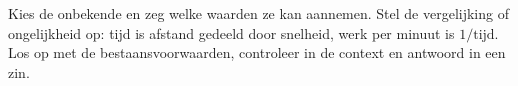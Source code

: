 \begin{werkwijze}
Kies de onbekende en zeg welke waarden ze kan aannemen. Stel de vergelijking of ongelijkheid op: tijd is afstand gedeeld door snelheid, werk per minuut is $1 / \text{tijd}$. Los op met de bestaansvoorwaarden, controleer in de context en antwoord in een zin.
\end{werkwijze}

\begin{oefeningen}
\end{oefeningen}

\opdrachtenkop

\begin{oefeningen}
























\end{oefeningen}

